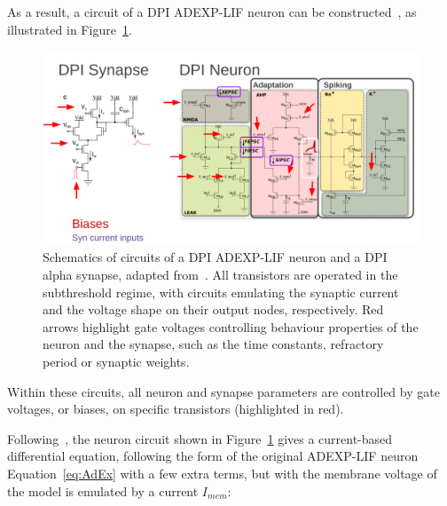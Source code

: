 
As a result, a circuit of a DPI \ac{ADEXP-LIF} neuron can be constructed~\cite{Livi_Indiveri09, Chicca_etal14}, as illustrated in Figure~\ref{fig:DPI_neuron_and_synapse}.

\begin{figure}[h]
    \centering
    \includegraphics[width=\textwidth]{img/chapter4/DPI_neuron_and_synapse.png}
    \caption[Schematics of circuits of a DPI \ac{ADEXP-LIF} neuron and a DPI alpha synapse]{Schematics of circuits of a DPI \ac{ADEXP-LIF} neuron and a DPI alpha synapse, adapted from~\cite{Chicca_etal14, Livi_Indiveri09}. All transistors are operated in the subthreshold regime, with circuits emulating the synaptic current and the voltage shape on their output nodes, respectively. Red arrows highlight gate voltages controlling behaviour properties of the neuron and the synapse, such as the time constants, refractory period or synaptic weights.}
    \label{fig:DPI_neuron_and_synapse}
\end{figure}

Within these circuits, all neuron and synapse parameters are controlled by gate voltages, or biases, on specific transistors (highlighted in red).


Following~\cite{Chicca_etal14}, the neuron circuit shown in Figure~\ref{fig:DPI_neuron_and_synapse} gives a current-based differential equation, following the form of the original \ac{ADEXP-LIF} neuron Equation~\ref{eq:AdEx} with a few extra terms, but with the membrane voltage of the model is emulated by a current $I_{mem}$: %


